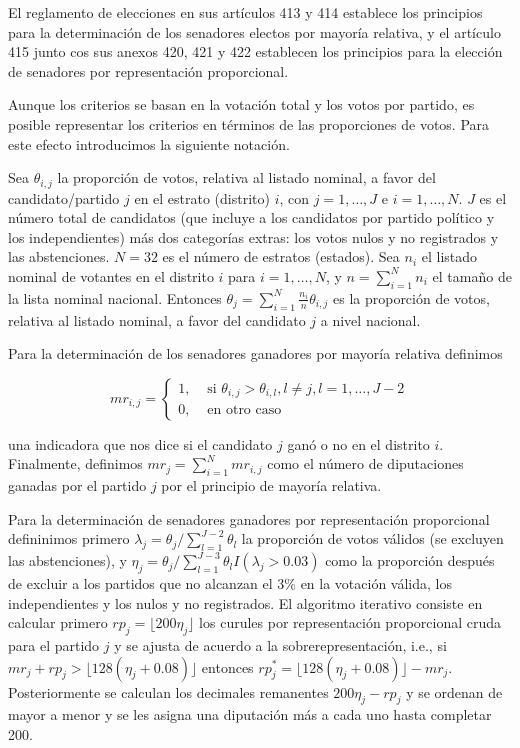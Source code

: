 \documentclass[]{article}
\begin{document}
El reglamento de elecciones en sus artículos 413 y 414 establece los principios para la determinación de los senadores electos por mayoría relativa, y el artículo 415 junto cos sus anexos 420, 421 y 422 establecen los principios para la elección de senadores por representación proporcional. 

Aunque los criterios se basan en la votación total y los votos por partido, es posible representar los criterios en términos de las proporciones de votos. Para este efecto introducimos la siguiente notación. 

Sea $\theta_{i,j}$ la proporción de votos, relativa al listado nominal, a favor del candidato/partido $j$ en el estrato (distrito) $i$, con $j=1,\ldots,J$ e $i=1,\ldots,N$. $J$ es el número total de candidatos (que incluye a los candidatos por partido político y los independientes) más dos categorías extras: los votos nulos y no registrados y las abstenciones. $N=32$ es el número de estratos (estados). Sea $n_i$ el listado nominal de votantes en el distrito $i$ para $i=1,\ldots,N$, y $n=\sum_{i=1}^N n_i$ el tamaño de la lista nominal nacional. Entonces $\theta_j=\sum_{i=1}^N\frac{n_i}{n}\theta_{i,j}$ es la proporción de votos, relativa al listado nominal, a favor del candidato $j$ a nivel nacional. 

Para la determinación de los senadores ganadores por mayoría relativa definimos 

\[ mr_{i,j}= \begin{cases} 
	1, & \text{ si } \theta_{i,j}>\theta_{i,l}, l\neq j, l=1,\ldots,J-2 \\
	0, & \text{ en otro caso }
   \end{cases}
\]

una indicadora que nos dice si el candidato $j$ ganó o no en el distrito $i$. Finalmente, definimos $mr_j=\sum_{i=1}^N mr_{i,j}$ como el número de diputaciones ganadas por el partido $j$ por el principio de mayoría relativa. 

Para la determinación de senadores ganadores por representación proporcional defininimos primero $\lambda_j=\theta_j/\sum_{l=1}^{J-2}\theta_l$ la proporción de votos válidos (se excluyen las abstenciones), y $\eta_j=\theta_j/\sum_{l=1}^{J-3}\theta_l I(\lambda_j>0.03)$ como la proporción después de excluir a los partidos que no alcanzan el 3\% en la votación válida, los independientes y los nulos y no registrados. El algoritmo iterativo consiste en calcular primero $rp_{j}=\lfloor{200\eta_j}\rfloor$ los curules por representación proporcional cruda para el partido $j$ y se ajusta de acuerdo a la sobrerepresentación, i.e., si $mr_j+rp_j>\lfloor{128(\eta_j+0.08)}\rfloor$ entonces $rp_j^*=\lfloor{128(\eta_j+0.08)}\rfloor-mr_j$. Posteriormente se calculan los decimales remanentes $200\eta_j-rp_j$ y se ordenan de mayor a menor y se les asigna una diputaci\'on m\'as a cada uno hasta completar 200.  
\end{document}
